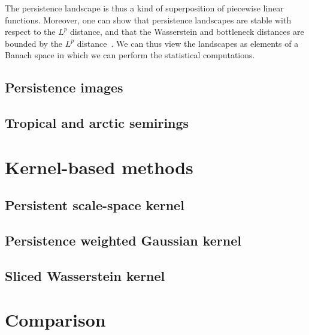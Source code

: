 \documentclass[a4paper,11pt,openany,extrafontsizes]{memoir}
\begin{document}
The persistence landscape is thus a kind of superposition of piecewise
linear functions. Moreover, one can show that persistence landscapes
are stable with respect to the $L^p$ distance, and that the
Wasserstein and bottleneck distances are bounded by the $L^p$
distance~\cite{bubenik_statistical_2015}. We can thus view the
landscapes as elements of a Banach space in which we can perform the
statistical computations.

\subsection{Persistence images}

\cite{adams_persistence_2017}

\subsection{Tropical and arctic semirings}

\cite{kalisnik_tropical_2018}

\section{Kernel-based methods}%
\label{sec:kernel-based-methods}

\subsection{Persistent scale-space kernel}

\cite{reininghaus_stable_2015,kwitt_statistical_2015}

\subsection{Persistence weighted Gaussian kernel}

\cite{kusano_kernel_2017}

\subsection{Sliced Wasserstein kernel}

\cite{carriere_sliced_2017}

\section{Comparison}%
\label{sec:comparison}




\backmatter%

\printbibliography%
\end{document}
